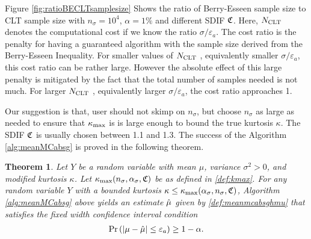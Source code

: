 \documentclass{iitthesis}
\newtheorem{theorem}{Theorem}[section]
\theoremstyle{definition}
\begin{document}
Figure \ref{fig:ratioBECLTsamplesize} Shows the ratio of Berry-Esseen sample size to CLT sample size with 
$n_\sigma = 10^4$, $\alpha = 1\%$ and different SDIF $\mathfrak{C}$. Here, $N_{\text{CLT}}$ denotes the computational cost if we know the ratio $\sigma/\varepsilon_a$. The cost ratio is the penalty for having a guaranteed algorithm with the sample size derived from the Berry-Esseen Inequality. For smaller values of $N_{\text{CLT}}$ , equivalently smaller $\sigma/\varepsilon_a$, this cost ratio can be rather large. However the absolute effect of this large penalty is mitigated by the fact that the total number of samples needed is not much. For larger $N_{\text{CLT}}$ , equivalently larger $\sigma/\varepsilon_a$,  the cost ratio approaches 1. 

Our suggestion is that, user should not skimp on $n_\sigma$, but choose $n_\sigma$ as large as needed to ensure that $\kappa_{\max}$ is is large enough to bound the true kurtosis $\kappa$. The SDIF $\mathfrak{C}$ is usually chosen between 1.1 and 1.3. The success of the Algorithm \ref{alg:meanMCabsg} is proved in the following theorem.
\begin{theorem} \cite[Theorem 5]{HJLO12}\label{thm:meanMCabsg}
Let $Y$ be a random variable with mean $\mu$, variance $\sigma^2 >0$, and modified kurtosis $\kappa$. Let $\kappa_{\max}(n_\sigma,\alpha_\sigma,\mathfrak{C})$ be as defined in \eqref{def:kmax}. For any random variable $Y$ with a bounded kurtosis $\kappa\leq\kappa_{\max}(\alpha_{\sigma},n_{\sigma},\mathfrak{C})$, Algorithm \ref{alg:meanMCabsg} above yields an estimate $\hat{\mu}$ given by \eqref{def:meanmcabsghmu} that satisfies the fixed width confidence interval condition
\begin{align}
\Pr\left( \left \lvert \mu-\hat{\mu} \right \rvert \leq \varepsilon_a \right) \geq 1-\alpha.
\end{align}
\end{theorem}
\end{document}
